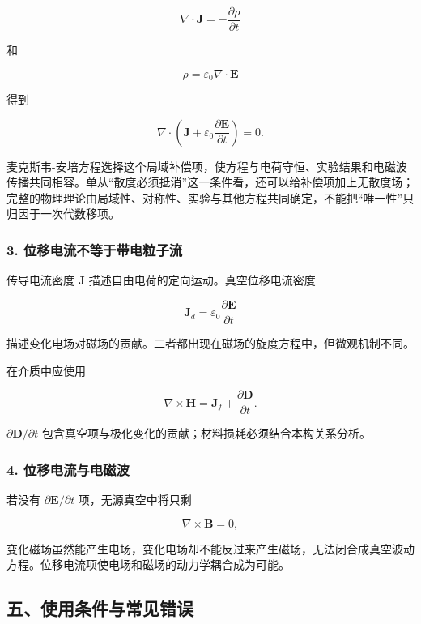 \[
\nabla\cdot\mathbf J
=-\frac{\partial\rho}{\partial t}
\]

和

\[
\rho=\varepsilon_0\nabla\cdot\mathbf E
\]

得到

\[
\nabla\cdot
\left(
\mathbf J+\varepsilon_0
\frac{\partial\mathbf E}{\partial t}
\right)=0.
\]

麦克斯韦-安培方程选择这个局域补偿项，使方程与电荷守恒、实验结果和电磁波传播共同相容。单从``散度必须抵消''这一条件看，还可以给补偿项加上无散度场；完整的物理理论由局域性、对称性、实验与其他方程共同确定，不能把``唯一性''只归因于一次代数移项。

\subsubsection{3.
位移电流不等于带电粒子流}\label{m7:ux4f4dux79fbux7535ux6d41ux4e0dux7b49ux4e8eux5e26ux7535ux7c92ux5b50ux6d41}

传导电流密度 \(\mathbf J\) 描述自由电荷的定向运动。真空位移电流密度

\[
\mathbf J_d
=\varepsilon_0\frac{\partial\mathbf E}{\partial t}
\]

描述变化电场对磁场的贡献。二者都出现在磁场的旋度方程中，但微观机制不同。

在介质中应使用

\[
\nabla\times\mathbf H
=\mathbf J_f+\frac{\partial\mathbf D}{\partial t}.
\]

\(\partial\mathbf D/\partial t\)
包含真空项与极化变化的贡献；材料损耗必须结合本构关系分析。

\subsubsection{4.
位移电流与电磁波}\label{m7:ux4f4dux79fbux7535ux6d41ux4e0eux7535ux78c1ux6ce2}

若没有 \(\partial\mathbf E/\partial t\) 项，无源真空中将只剩

\[
\nabla\times\mathbf B=0,
\]

变化磁场虽然能产生电场，变化电场却不能反过来产生磁场，无法闭合成真空波动方程。位移电流项使电场和磁场的动力学耦合成为可能。

\subsection{五、使用条件与常见错误}\label{m7:ux4e94ux4f7fux7528ux6761ux4ef6ux4e0eux5e38ux89c1ux9519ux8bef}

